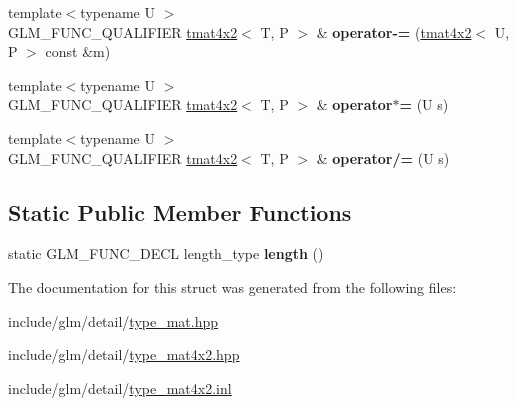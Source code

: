 \begin{DoxyCompactItemize}
{\footnotesize template$<$typename U $>$ }\\G\+L\+M\+\_\+\+F\+U\+N\+C\+\_\+\+Q\+U\+A\+L\+I\+F\+I\+ER \hyperlink{structglm_1_1tmat4x2}{tmat4x2}$<$ T, P $>$ \& {\bfseries operator-\/=} (\hyperlink{structglm_1_1tmat4x2}{tmat4x2}$<$ U, P $>$ const \&m)
\item 
\mbox{\label{structglm_1_1tmat4x2_abff57703eba125c97a625c94924d8e52}} 
{\footnotesize template$<$typename U $>$ }\\G\+L\+M\+\_\+\+F\+U\+N\+C\+\_\+\+Q\+U\+A\+L\+I\+F\+I\+ER \hyperlink{structglm_1_1tmat4x2}{tmat4x2}$<$ T, P $>$ \& {\bfseries operator$\ast$=} (U s)
\item 
\mbox{\label{structglm_1_1tmat4x2_a7ad8f4359e6257d46c597bc345d90205}} 
{\footnotesize template$<$typename U $>$ }\\G\+L\+M\+\_\+\+F\+U\+N\+C\+\_\+\+Q\+U\+A\+L\+I\+F\+I\+ER \hyperlink{structglm_1_1tmat4x2}{tmat4x2}$<$ T, P $>$ \& {\bfseries operator/=} (U s)
\end{DoxyCompactItemize}
\subsection*{Static Public Member Functions}
\begin{DoxyCompactItemize}
\item 
\mbox{\label{structglm_1_1tmat4x2_ac92a6ef242b14bc41a187b58984e4968}} 
static G\+L\+M\+\_\+\+F\+U\+N\+C\+\_\+\+D\+E\+CL length\+\_\+type {\bfseries length} ()
\end{DoxyCompactItemize}


The documentation for this struct was generated from the following files\+:\begin{DoxyCompactItemize}
\item 
include/glm/detail/\hyperlink{type__mat_8hpp}{type\+\_\+mat.\+hpp}\item 
include/glm/detail/\hyperlink{type__mat4x2_8hpp}{type\+\_\+mat4x2.\+hpp}\item 
include/glm/detail/\hyperlink{type__mat4x2_8inl}{type\+\_\+mat4x2.\+inl}\end{DoxyCompactItemize}
